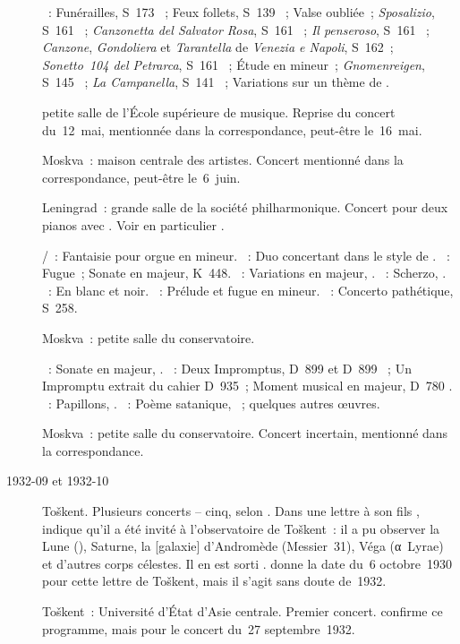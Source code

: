 \begin{description}
 \textsc{\Liszt{}}~: Funérailles, S~173 ~; Feux follets, S~139
 ~; Valse oubliée~; \emph{Sposalizio}, S~161 ~;
 \emph{Canzonetta del Salvator Rosa}, S~161 ~; \emph{Il
 penseroso}, S~161 ~; \emph{Canzone}, \emph{Gondoliera} et
 \emph{Tarantella} de \emph{Venezia e Napoli}, S~162~; \emph{Sonetto~104
 del Petrarca}, S~161 ~; Étude en \kF mineur~;
 \emph{Gnomenreigen}, S~145 ~; \emph{La Campanella}, S~141
 ~; Variations sur un thème de \Paganini{}.
 \item[\DateWithWeekDay{1932-05-14}]
 petite salle de l'\hbox{École} supérieure de musique.
 Reprise du concert du~12~mai, mentionnée dans la correspondance, peut-être
 le~16~mai.
 \item[\DateWithWeekDay{1932-06-05}]
 Moskva~: maison centrale des artistes.
 Concert mentionné dans la correspondance, peut-être le~6~juin.
 \item[\DateWithWeekDay{1932-06-09}]
 Leningrad~: grande salle de la société philharmonique.
 Concert pour deux pianos avec \LOborine{}.
 Voir en particulier \citet[p.~437]{Milshteyn82a}.

 \textsc{\Mozart{}/\Busoni{}}~: Fantaisie pour orgue en \kF mineur.
 \textsc{\Busoni{}}~: Duo concertant dans le style de \Mozart{}.
 \textsc{\Mozart{}}~: Fugue~; Sonate en \kD majeur, K~448.
 \textsc{\Schumann{}}~: Variations en \kB \Flat majeur, .
 \textsc{\SaintSaens{}}~: Scherzo, .
 \textsc{\Debussy{}}~: En blanc et noir.
 \textsc{\Taneiev{}}~: Prélude et fugue en \kG \Sharp mineur.
 \textsc{\Liszt{}}~: Concerto pathétique, S~258.
 \item[\DateWithWeekDay{1932-06-24}]
 Moskva~: petite salle du conservatoire.

 \textsc{\Beethoven{}}~: Sonate en \kD majeur, .
 \textsc{\Schubert{}}~: Deux Impromptus, D~899  et D~899
 ~; Un Impromptu extrait du cahier D~935~; Moment musical en \kA
 \Flat majeur, D~780 .
 \textsc{\Schumann{}}~: Papillons, .
 \textsc{\Scriabine{}}~: Poème satanique, ~; quelques autres
 œuvres.
 \item[\DateWithWeekDay{1932-07-17}]
 Moskva~: petite salle du conservatoire.
 Concert incertain, mentionné dans la correspondance.
 \item[1932-09 et 1932-10]
 Toškent.
 Plusieurs concerts -- cinq, selon \citet[p.~155]{Nekrasova08}.
 Dans une lettre à son fils \citet[p.~44]{Sofronitsky82b}, \VSofronitsky{}
 indique qu'il a été invité à l'observatoire de Toškent~: il a pu observer
 la Lune (), Saturne, la [galaxie]
 d'Andromède (Messier~31), Véga (α~Lyrae) et d'autres corps célestes.
 Il en est sorti .
 \citet[p.~44]{Sofronitsky82b} donne la date du~6 octobre~1930 pour cette
 lettre de Toškent, mais il s'agit sans doute de~1932.
 \item[\DateWithWeekDay{1932-09-24}]
 Toškent~: Université d'\hbox{État} d'\hbox{Asie} centrale.
 Premier concert.
 \citet[p.~155]{Nekrasova08} confirme ce programme, mais pour le concert
 du~27 septembre~1932.


\end{description}
